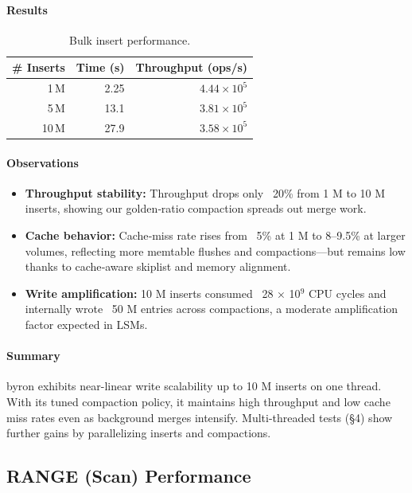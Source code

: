 \documentclass[10pt]{article}
\begin{document}
\paragraph{Results}
\begin{table}[htbp]
  \centering
  \small
  \begin{tabular}{r r r}
    \toprule
    \# Inserts & Time (s) & Throughput (ops/s) \\
    \midrule
    1\,M  & 2.25   & $4.44\times10^5$ \\
    5\,M  & 13.1   & $3.81\times10^5$ \\
    10\,M & 27.9   & $3.58\times10^5$ \\
    \bottomrule
  \end{tabular}
  \caption{Bulk insert performance.}
  \label{tab:put_perf}
\end{table}

\paragraph{Observations}
\begin{itemize}[itemsep=0.5ex]
  \item \textbf{Throughput stability:} Throughput drops only ~20\% from 1 M to 10 M inserts, showing our golden‐ratio compaction spreads out merge work.
  \item \textbf{Cache behavior:} Cache‐miss rate rises from ~5\% at 1 M to 8–9.5\% at larger volumes, reflecting more memtable flushes and compactions—but remains low thanks to cache‐aware skiplist and memory alignment.
  \item \textbf{Write amplification:} 10 M inserts consumed ~28 × 10\(^9\) CPU cycles and internally wrote ~50 M entries across compactions, a moderate amplification factor expected in LSMs.
\end{itemize}

\paragraph{Summary}
byron exhibits near-linear write scalability up to 10 M inserts on one thread.  With its tuned compaction policy, it maintains high throughput and low cache miss rates even as background merges intensify. Multi-threaded tests (§4) show further gains by parallelizing inserts and compactions.

\subsection{RANGE (Scan) Performance}
\end{document}
